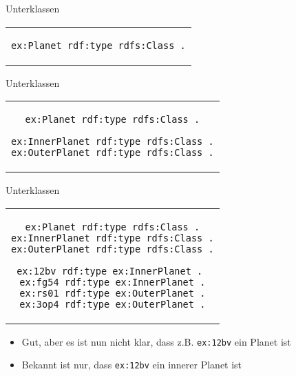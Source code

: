 \documentclass{beamer}
\begin{document}
\begin{frame}[fragile]{Unterklassen}
	
	\begin{center}
		\begin{tabular}{c}
			\begin{lstlisting}
ex:Planet rdf:type rdfs:Class .
			\end{lstlisting}
		\end{tabular}
	\end{center}
	
\end{frame}

\begin{frame}[fragile]{Unterklassen}
	
	\begin{center}
		\begin{tabular}{c}
			\begin{lstlisting}
ex:Planet rdf:type rdfs:Class .

ex:InnerPlanet rdf:type rdfs:Class .
ex:OuterPlanet rdf:type rdfs:Class .
			\end{lstlisting}
		\end{tabular}
	\end{center}
	
\end{frame}

\begin{frame}[fragile]{Unterklassen}
	
	\begin{center}
		\begin{tabular}{c}
			\begin{lstlisting}
ex:Planet rdf:type rdfs:Class .
ex:InnerPlanet rdf:type rdfs:Class .
ex:OuterPlanet rdf:type rdfs:Class .

ex:12bv rdf:type ex:InnerPlanet . 
ex:fg54 rdf:type ex:InnerPlanet .
ex:rs01 rdf:type ex:OuterPlanet .
ex:3op4 rdf:type ex:OuterPlanet .
			\end{lstlisting}
		\end{tabular}
	\end{center}
	
	\begin{itemize}
		\item Gut, aber es ist nun nicht klar, dass z.B. \texttt{ex:12bv} ein Planet ist
		\item Bekannt ist nur, dass \texttt{ex:12bv} ein innerer Planet ist
	\end{itemize}
	
\end{frame}
\end{document}
